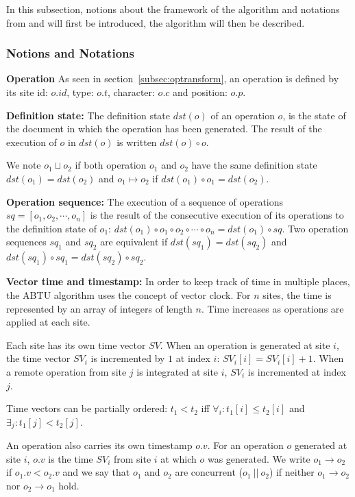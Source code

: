 \documentclass[11pt, a4paper, oneside, openright]{article} %
\begin{document}
In this subsection, notions about the framework of the algorithm and notations from \cite{abtu} and \cite{abtuu} will first be introduced, the algorithm will then be described.

\subsubsection{Notions and Notations}

\textbf{Operation} As seen in section~\ref{subsec:optransform}, an operation is defined by its site id: $o.id$, type: $o.t$, character: $o.c$ and position: $o.p$.

\textbf{Definition state:} The definition state $dst(o)$ of an operation $o$, is the state of the document in which the operation has been generated. The result of the execution of $o$ in $dst(o)$ is written $dst(o) \circ o$.

We note $o_1 \sqcup o_2$ if both operation $o_1$ and $o_2$ have the same definition state $dst(o_1) = dst(o_2)$ and $o_1 \mapsto o_2$ if $dst(o_1) \circ o_1 = dst(o_2)$.

\textbf{Operation sequence:} The execution of a sequence of operations $sq = [o_1, o_2, \cdots, o_n]$ is the result of the consecutive execution of its operations to the definition state of $o_1$: $dst(o_1) \circ o_1 \circ o_2 \circ \cdots \circ o_n = dst(o_1) \circ sq $. Two operation sequences $sq_1$ and $sq_2$ are equivalent if $ dst(sq_1) = dst(sq_2)$ and $dst(sq_1) \circ sq_1 = dst(sq_2) \circ sq_2$.

\textbf{Vector time and timestamp:} In order to keep track of time in multiple places, the ABTU algorithm uses the concept of vector clock. For $n$ sites, the time is represented by an array of integers of length $n$. Time increases as operations are applied at each site.

Each site has its own time vector $SV$. When an operation is generated at site $i$, the time vector $SV_i$ is incremented by $1$ at index $i$: $SV_i[i] = SV_i[i] + 1$. When a remote operation from site $j$ is integrated at site $i$, $SV_i$ is incremented at index $j$.

Time vectors can be partially ordered: $t_1 < t_2$ iff $\forall _i: t_1[i] \leq t_2[i]$ and  $\exists _j : t_1[j] < t_2[j]$.

An operation also carries its own timestamp $o.v$. For an operation $o$ generated at site $i$, $o.v$ is the time $SV_i$ from site $i$ at which $o$ was generated. We write $o_1 \rightarrow o_2$ if $o_1.v < o_2.v$ and we say that $o_1$ and $o_2$ are concurrent ($o_1\ || \ o_2$) if neither $o_1 \rightarrow o_2$ nor $o_2 \rightarrow o_1$ hold.
\end{document}
